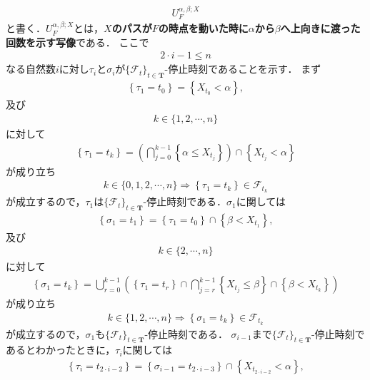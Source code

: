 	\begin{align}
		U_F^{\alpha,\beta;X}
	\end{align}
	と書く．$U_F^{\alpha,\beta;X}$とは，{\bf $X$のパスが$F$の時点を動いた時に$\alpha$から$\beta$へ上向きに渡った回数を示す写像}である．
	ここで
	\begin{align}
		2 \cdot i - 1 \leq n
	\end{align}
	なる自然数$i$に対し$\tau_i$と$\sigma_i$が$\{\mathscr{F}_t\}_{t \in \mathbf{T}}$-停止時刻であることを示す．
	まず
	\begin{align}
		\left\{\tau_1 = t_0\right\} = \left\{ X_{t_0} < \alpha \right\},
	\end{align}
	及び
	\begin{align}
		k \in \{1,2,\cdots,n\}
	\end{align}
	に対して
	\begin{align}
		\left\{\tau_1 = t_k\right\} = \left(\bigcap_{j=0}^{k-1} \left\{\alpha \leq X_{t_j}\right\}\right) 
		\cap \left\{ X_{t_j}< \alpha \right\}
	\end{align}
	が成り立ち
	\begin{align}
		k \in \{0,1,2,\cdots,n\} \Longrightarrow \left\{\tau_1 = t_k\right\} \in \mathscr{F}_{t_k}
 	\end{align}
 	が成立するので，$\tau_1$は$\{\mathscr{F}_t\}_{t \in \mathbf{T}}$-停止時刻である．$\sigma_1$に関しては
 	\begin{align}
		\left\{\sigma_1 = t_1\right\} = \left\{\tau_1 = t_0\right\} \cap \left\{\beta < X_{t_1}\right\},
	\end{align}
	及び
	\begin{align}
		k \in \{2,\cdots,n\}
	\end{align}
	に対して
	\begin{align}
		\left\{\sigma_1 = t_k\right\} = 
		\bigcup_{r=0}^{k-1}\left( \left\{\tau_1=t_r\right\} \cap \bigcap_{j=r}^{k-1} \left\{X_{t_j} \leq \beta\right\} \cap \left\{\beta < X_{t_k}\right\} \right)
	\end{align}
	が成り立ち
	\begin{align}
		k \in \{1,2,\cdots,n\} \Longrightarrow \left\{\sigma_1 = t_k\right\} \in \mathscr{F}_{t_k}
 	\end{align}
 	が成立するので，$\sigma_1$も$\{\mathscr{F}_t\}_{t \in \mathbf{T}}$-停止時刻である．
 	$\sigma_{i-1}$まで$\{\mathscr{F}_t\}_{t \in \mathbf{T}}$-停止時刻であるとわかったときに，$\tau_i$に関しては
 	\begin{align}
		\left\{\tau_i = t_{2 \cdot i-2}\right\} = \left\{\sigma_{i-1} = t_{2 \cdot i-3}\right\} \cap \left\{X_{t_{2 \cdot i-2}} < \alpha\right\},
	\end{align}
